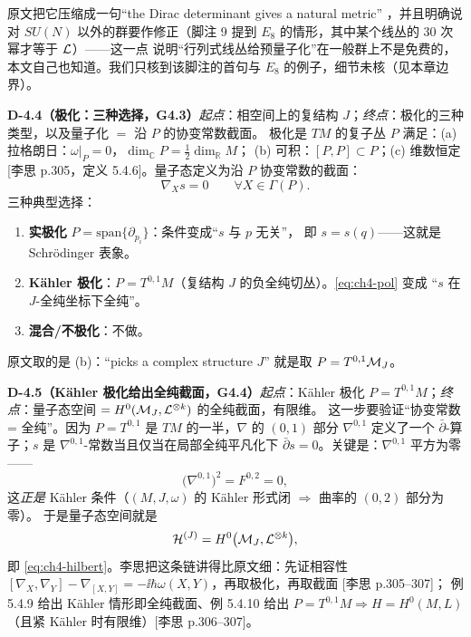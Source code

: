 原文把它压缩成一句“the Dirac determinant gives a natural metric” ，并且明确说对
$SU(N)$ 以外的群要作修正（脚注 9 提到 $E_8$ 的情形，其中某个线丛的 30 次幂才等于 $\mathcal{L}$）——这一点
说明“行列式线丛给预量子化”在一般群上不是免费的，本文自己也知道。我们只核到该脚注的首句与
$E_8$ 的例子，细节未核（见本章边界）。

\noindent\textbf{D-4.4（极化：三种选择，G4.3）}\quad\emph{起点}：相空间上的复结构 $J$；\emph{终点}：极化的三种类型，以及量子化 $=$ 沿 $P$ 的协变常数截面。
极化是 $TM$ 的复子丛 $P$ 满足：(a) 拉格朗日：$\omega|_P=0$，$\dim_\mathbb C P=\frac12\dim_\mathbb R M$；
(b) 可积：$[P,P]\subset P$；(c) 维数恒定 [李思 p.305，定义 5.4.6]。量子态定义为沿 $P$ 协变常数的截面：
\begin{equation}
\nabla_X s=0\qquad\forall X\in\Gamma(P).
\label{eq:ch4-pol}
\end{equation}
三种典型选择：
\begin{enumerate}[label=(\alph*),leftmargin=2.2em]
\item \textbf{实极化} $P=\mathrm{span}\{\partial_{p_i}\}$：条件变成“$s$ 与 $p$ 无关”，
即 $s=s(q)$——这就是 Schrödinger 表象。
\item \textbf{Kähler 极化}：$P=T^{0,1}M$（复结构 $J$ 的负全纯切丛）。\eqref{eq:ch4-pol} 变成
“$s$ 在 $J$-全纯坐标下全纯”。
\item \textbf{混合/不极化}：不做。
\end{enumerate}
原文取的是 (b)：“picks a complex structure $J$”  就是取 $P=T^{0,1}\mathcal{M}_J$。

\noindent\textbf{D-4.5（Kähler 极化给出全纯截面，G4.4）}\quad\emph{起点}：K\"ahler 极化 $P=T^{0,1}M$；\emph{终点}：量子态空间 $=H^0(\mathcal{M}_J,\mathcal{L}^{\otimes k})$ 的全纯截面，有限维。
这一步要验证“协变常数 = 全纯”。因为 $P=T^{0,1}$ 是 $TM$ 的一半，$\nabla$ 的 $(0,1)$ 部分
$\nabla^{0,1}$ 定义了一个 $\bar\partial$-算子；$s$ 是 $\nabla^{0,1}$-常数当且仅当在局部全纯平凡化下
$\bar\partial s=0$。关键是：$\nabla^{0,1}$ 平方为零——
\begin{equation}
\bigl(\nabla^{0,1}\bigr)^2=F^{0,2}=0 ,
\end{equation}
这\emph{正是} Kähler 条件（$(M,J,\omega)$ 的 Kähler 形式闭 $\Rightarrow$ 曲率的 $(0,2)$ 部分为零）。
于是量子态空间就是
\begin{equation}
\mathcal{H}^{(J)}=H^0\bigl(\mathcal{M}_J,\mathcal{L}^{\otimes k}\bigr),
\end{equation}
即 \eqref{eq:ch4-hilbert}。李思把这条链讲得比原文细：先证相容性
$[\nabla_X,\nabla_Y]-\nabla_{[X,Y]}=-\ii\hbar\omega(X,Y)$，再取极化，再取截面 [李思 p.305--307]；
例 5.4.9 给出 Kähler 情形即全纯截面、例 5.4.10 给出 $P=T^{0,1}M\Rightarrow H=H^0(M,L)$
（且紧 Kähler 时有限维）[李思 p.306--307]。


